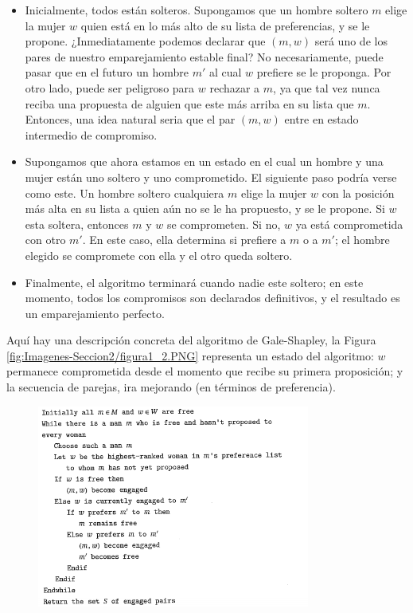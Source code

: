 \documentclass[a4paper, 12pt]{book}
\theoremstyle{dotless}
\begin{document}
\begin{itemize}
    \item Inicialmente, todos están solteros. Supongamos que un hombre soltero $m$ elige la mujer $w$ quien está en lo más alto de su lista de preferencias, y se le propone. ¿Inmediatamente podemos declarar que $(m,w)$ será uno de los pares de nuestro emparejamiento estable final? No necesariamente, puede pasar que en el futuro un hombre $m'$ al cual $w$ prefiere se le proponga. Por otro lado, puede ser peligroso para $w$ rechazar a $m$, ya que tal vez nunca reciba una propuesta de alguien que este más arriba en su lista que $m$. Entonces, una idea natural seria que el par $(m,w)$ entre en estado intermedio de compromiso.
    \item Supongamos que ahora estamos en un estado en el cual un hombre y una mujer están uno soltero y uno comprometido. El siguiente paso podría verse como este. Un hombre soltero cualquiera $m$ elige la mujer $w$ con la posición más alta en su lista a quien aún no se le ha propuesto, y se le propone. Si $w$ esta soltera, entonces $m$ y $w$ se comprometen. Si no, $w$ ya está comprometida con otro $m'$. En este caso, ella determina si prefiere a $m$ o a $m'$; el hombre elegido se compromete con ella y el otro queda soltero. 
    \item Finalmente, el algoritmo terminará cuando nadie este soltero; en este momento, todos los compromisos son declarados definitivos, y el resultado es un emparejamiento perfecto. 
\end{itemize}
    
Aquí hay una descripción concreta del algoritmo de Gale-Shapley, la Figura \ref{fig:Imagenes-Seccion2/figura1_2.PNG} representa un estado del algoritmo: $w$ permanece comprometida desde el momento que recibe su primera proposición; y la secuencia de parejas, ira mejorando (en términos de preferencia).

\begin{figure}[h] 
    \centering
    \includegraphics[width=0.8\textwidth]{Imagenes-Seccion2/Imagen1_2.PNG}
\end{figure}
\end{document}
